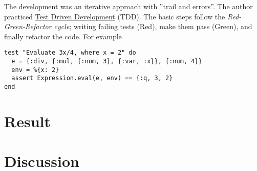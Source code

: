 \documentclass[a4paper,11pt]{article}
\begin{document}
\label{subsec:workflow}
The development was an iterative approach with ''trail and errors''.
The author practiced
\href{https://www.elixirwiki.com/wiki/Test-Driven_Development_in_Elixir}{Test Driven Development}
(TDD).
The basic steps follow the \emph{Red-Green-Refactor cycle};
writing failing tests (Red), make them pass (Green),
and finally refactor the code.
For example
\begin{verbatim}
test "Evaluate 3x/4, where x = 2" do
  e = {:div, {:mul, {:num, 3}, {:var, :x}}, {:num, 4}}
  env = %{x: 2}
  assert Expression.eval(e, env) == {:q, 3, 2}
end
\end{verbatim}

\section*{Result}
\label{sec:result}

\section*{Discussion}
\label{sec:discussion}
\end{document}
